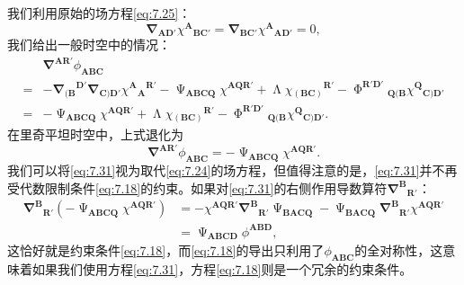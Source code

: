 我们利用原始的场方程\ref{eq:7.25}：
\begin{equation*}
	\mathbf{\nabla }_{\boldsymbol{AD} '} \chi ^{\boldsymbol{A}}{}_{\boldsymbol{BC} '} =\mathbf{\nabla }_{\boldsymbol{BC} '} \chi ^{\boldsymbol{A}}{}_{\boldsymbol{AD} '} =0,
\end{equation*}
我们给出一般时空中的情况：
\begin{equation*}
	\begin{aligned}
		& \mathbf{\nabla }^{\boldsymbol{AR} '} \phi _{\boldsymbol{ABC}}\\
		= & -\mathbf{\nabla }{_{(\boldsymbol{B}}}^{\boldsymbol{D} '}\mathbf{\nabla }_{\boldsymbol{C})\boldsymbol{D} '} \chi ^{\boldsymbol{A}}{}{_{\boldsymbol{A}}}^{\boldsymbol{R} '} -\upPsi _{\boldsymbol{ABCQ}} \chi ^{\boldsymbol{AQR} '} +\upLambda \chi {_{(\boldsymbol{BC})}}^{\boldsymbol{R} '} -\upPhi ^{\boldsymbol{R} '\boldsymbol{D} '}{}_{\boldsymbol{Q}(\boldsymbol{B}} \chi ^{\boldsymbol{Q}}{}_{\boldsymbol{C})\boldsymbol{D} '}\\
		= & -\upPsi _{\boldsymbol{ABCQ}} \chi ^{\boldsymbol{AQR} '} +\upLambda \chi {_{(\boldsymbol{BC})}}^{\boldsymbol{R} '} -\upPhi ^{\boldsymbol{R} '\boldsymbol{D} '}{}_{\boldsymbol{Q}(\boldsymbol{B}} \chi ^{\boldsymbol{Q}}{}_{\boldsymbol{C})\boldsymbol{D} '} .
	\end{aligned}
\end{equation*}
在里奇平坦时空中，上式退化为
\begin{equation}
	\mathbf{\nabla }^{\boldsymbol{AR} '} \phi _{\boldsymbol{ABC}} =-\upPsi _{\boldsymbol{ABCQ}} \chi ^{\boldsymbol{AQR} '} .
	\label{eq:7.31}
\end{equation}
我们可以将\ref{eq:7.31}视为取代\ref{eq:7.24}的场方程，但值得注意的是，\ref{eq:7.31}并不再受代数限制条件\ref{eq:7.18}的约束。如果对\ref{eq:7.31}的右侧作用导数算符$\mathbf{\nabla }^{\boldsymbol{B}}{}_{\boldsymbol{R} '}$：
\begin{equation*}
	\begin{aligned}
		\mathbf{\nabla }^{\boldsymbol{B}}{}_{\boldsymbol{R} '} (-\upPsi _{\boldsymbol{ABCQ}} \chi ^{\boldsymbol{AQR} '} ) & =-\chi ^{\boldsymbol{AQR} '}\mathbf{\nabla }^{\boldsymbol{B}}{}_{\boldsymbol{R} '} \upPsi _{\boldsymbol{BACQ}} -\upPsi _{\boldsymbol{BACQ}}\mathbf{\nabla }^{\boldsymbol{B}}{}_{\boldsymbol{R} '} \chi ^{\boldsymbol{AQR} '}\\
		& =\upPsi _{\boldsymbol{ABCD}} \phi ^{\boldsymbol{ABD}} ,
	\end{aligned}
\end{equation*}
这恰好就是约束条件\ref{eq:7.18}，而\ref{eq:7.18}的导出只利用了$\phi _{\boldsymbol{ABC}}$的全对称性，这意味着如果我们使用方程\ref{eq:7.31}，方程\ref{eq:7.18}则是一个冗余的约束条件。



